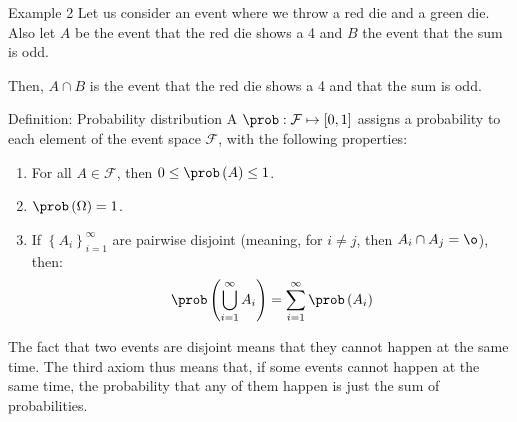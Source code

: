 \documentclass[a4paper]{article}
\begin{document}
\begin{parag}{Example 2}
    Let us consider an event where we throw a red die and a green die. Also let $A$ be the event that the red die shows a 4 and $B$ the event that the sum is odd.

    Then, $A \cap B$ is the event that the red die shows a 4 and that the sum is odd.
\end{parag}

\begin{parag}{Definition: Probability distribution}
    A  $\prob: \mathcal{F} \mapsto \left[0, 1\right]$ assigns a probability to each element of the event space $\mathcal{F}$, with the following properties:
    \begin{enumerate}
        \item For all $A \in \mathcal{F}$, then $0 \leq \prob\left(A\right) \leq 1$.
        \item $\prob\left(\Omega\right) = 1$.
        \item If $\left\{A_i\right\}_{i=1}^{\infty}$ are pairwise disjoint (meaning, for $i \neq j$, then $A_i \cap A_j = \o$), then: 
        \[\prob\left(\bigcup_{i=1}^{\infty} A_i\right) = \sum_{i=1}^{\infty} \prob\left(A_i\right)\]
    \end{enumerate}

    The fact that two events are disjoint means that they cannot happen at the same time. The third axiom thus means that, if some events cannot happen at the same time, the probability that any of them happen is just the sum of probabilities.
\end{parag}
\end{document}
